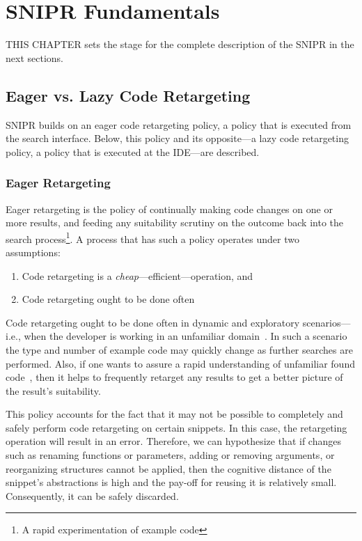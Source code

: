\chapter{\uppercase{SnipR} Fundamentals}{}
\label{sec:fundamentals}


\lettrine[lraise=0.1, nindent=0em, slope=-.5em]{T} {HIS CHAPTER} sets the stage for the complete description of the \uppercase{SnipR} in the next sections.

\section{Eager vs. Lazy Code Retargeting}
\label{sec:eagervslazy}

\uppercase{SnipR} builds on an eager code retargeting policy, a policy that is executed from the search interface. Below, this policy and its opposite---a lazy code retargeting policy, a policy that is executed at the IDE---are described.

\subsection{Eager Retargeting}

Eager retargeting is the policy of continually making code changes on one or more results, and feeding any suitability scrutiny on the outcome back into the search process\footnote{A rapid experimentation of example code}. A process that has such a policy operates under two assumptions:

\begin{enumerate}
	\item Code retargeting is a \emph{cheap}---efficient---operation, and
	\item Code retargeting ought to be done often
\end{enumerate}

Code retargeting ought to be done often in dynamic and exploratory scenarios---i.e., when the developer is working in an unfamiliar domain~\cite{Brandt:2009ew}. In such a scenario the type and number of example code may quickly change as further searches are performed. Also, if one wants to assure a rapid understanding of unfamiliar found code~\cite{Brandt:2009ew}, then it helps to frequently retarget any results to get a better picture of the result's suitability.

This policy accounts for the fact that it may not be possible to completely and safely perform code retargeting on certain snippets. In this case, the retargeting operation will result in an error. Therefore, we can hypothesize that if changes such as renaming functions or parameters, adding or removing arguments, or reorganizing structures cannot be applied, then the cognitive distance of the snippet's abstractions is high and the pay-off for reusing it is relatively small. Consequently, it can be safely discarded.    

